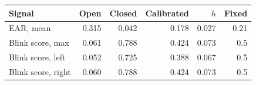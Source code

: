 \begin{tabular}{lrrrrr}
\toprule
Signal & Open & Closed & Calibrated & $h$ & Fixed \\
\midrule
EAR, mean & 0.315 & 0.042 & 0.178 & 0.027 & 0.21 \\
Blink score, max & 0.061 & 0.788 & 0.424 & 0.073 & 0.5 \\
Blink score, left & 0.052 & 0.725 & 0.388 & 0.067 & 0.5 \\
Blink score, right & 0.060 & 0.788 & 0.424 & 0.073 & 0.5 \\
\bottomrule
\end{tabular}
